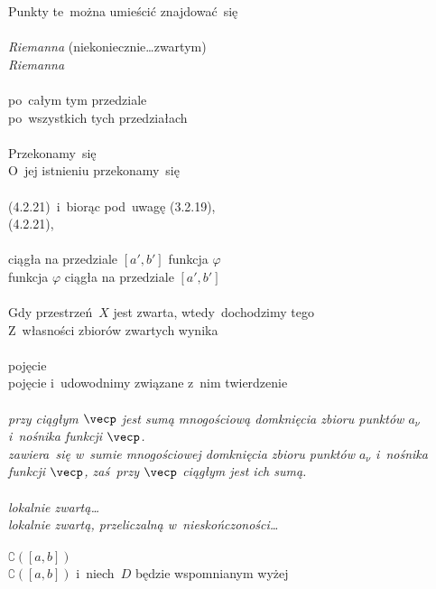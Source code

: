 \documentclass[a4paper,11pt]{article}
\numberwithin{equation}{section}
\begin{document}
\PowinnoByc Punkty te~można umieścić znajdować~się \\
 \\
\Jest \textit{Riemanna} (niekoniecznie\ldots zwartym) \\
\PowinnoByc \textit{Riemanna} \\
 \\
\Jest po~całym tym przedziale \\
\PowinnoByc po~wszystkich tych przedziałach \\
 \\
\Jest Przekonamy~się \\
\PowinnoByc O~jej istnieniu przekonamy~się \\
 \\
\Jest (4.2.21)~i~biorąc pod~uwagę (3.2.19), \\
\PowinnoByc (4.2.21), \\
 \\
\Jest ciągła na przedziale $[ a', b' ]$ funkcja $\varphi$ \\
\PowinnoByc funkcja $\varphi$ ciągła na przedziale $[ a', b' ]$ \\
 \\
\Jest Gdy przestrzeń~$X$ jest zwarta, wtedy~dochodzimy tego \\
\PowinnoByc Z~własności zbiorów zwartych wynika \\
 \\
\Jest pojęcie \\
\PowinnoByc pojęcie i~udowodnimy związane z~nim twierdzenie \\
 \\
\Jest \textit{przy ciągłym $\vecp$ jest sumą mnogościową domknięcia
  zbioru punktów $a_{ \nu }$ i~nośnika
  funkcji $\vecp$.} \\
\PowinnoByc \textit{zawiera~się w~sumie mnogościowej domknięcia zbioru
  punktów $a_{ \nu }$ i~nośnika funkcji $\vecp$, zaś~przy
  $\vecp$ ciągłym jest ich sumą.} \\
 \\
\Jest \textit{lokalnie zwartą\ldots} \\
\PowinnoByc \textit{lokalnie zwartą, przeliczalną w~nieskończoności\ldots} \\
 \\
\Jest $\complement ( [ a, b ] )$ \\
\PowinnoByc $\complement ( [ a, b ] )$ i~niech~$D$ będzie wspomnianym wyżej
\end{document}
